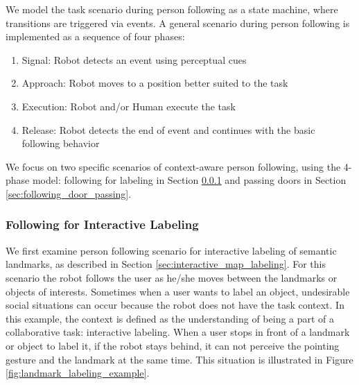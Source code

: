 \documentclass{tADR2e}
\begin{document}
We model the task scenario during person following as a state machine, where transitions are triggered via events. A general scenario during person following is implemented as a sequence of four phases:

\begin{enumerate}
\item Signal: Robot detects an event using perceptual cues
\item Approach: Robot moves to a position better suited to the task
\item Execution: Robot and/or Human execute the task
\item Release: Robot detects the end of event and continues with the basic following behavior
\end{enumerate}

We focus on two specific scenarios of context-aware person following, using the 4-phase model: following for labeling in Section \ref{sec:following_for labeling} and passing doors in Section \ref{sec:following_door_passing}.

\subsubsection{Following for Interactive Labeling}
\label{sec:following_for labeling}

We first examine person following scenario for interactive labeling of semantic landmarks, as described in Section \ref{sec:interactive_map_labeling}. For this scenario the robot follows the user as he/she moves between the landmarks or objects of interests. Sometimes when a user wants to label an object, undesirable social situations can occur because the robot does not have the task context. In this example, the context is defined as the understanding of being a part of a collaborative task: interactive labeling. When a user stops in front of a landmark or object to label it, if the robot stays behind, it can not perceive the pointing gesture and the landmark at the same time. This situation is illustrated in Figure \ref{fig:landmark_labeling_example}. 
\end{document}
